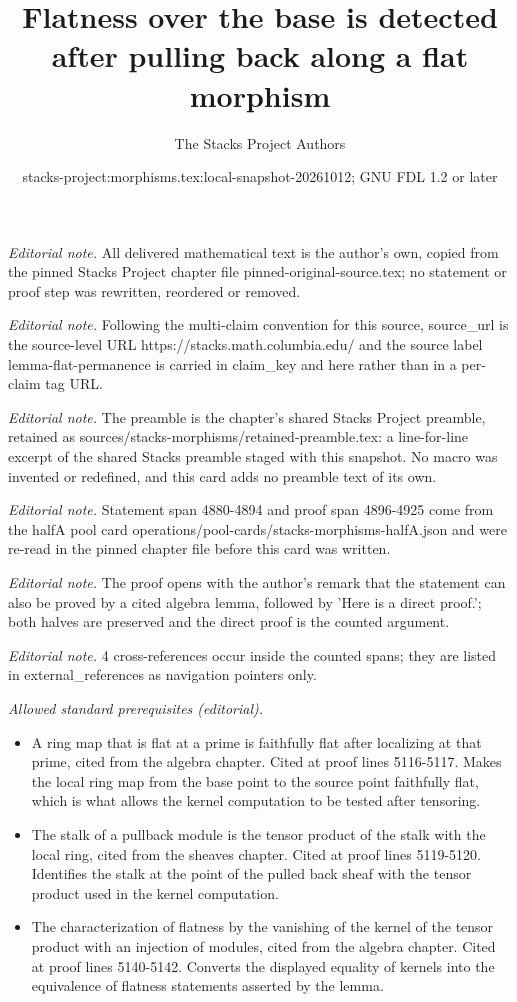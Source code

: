 \documentclass[10pt,a4paper]{amsart}
\title{Flatness over the base is detected after pulling back along a flat morphism}
\author{The Stacks Project Authors}
\date{stacks-project:morphisms.tex:local-snapshot-20261012; GNU FDL 1.2 or later}
\theoremstyle{plain}
\theoremstyle{definition}
\theoremstyle{remark}
\numberwithin{equation}{subsection}
\begin{document}
\maketitle
\noindent\textit{Editorial note.} All delivered mathematical text is the author's own, copied from the pinned Stacks Project chapter file pinned-original-source.tex; no statement or proof step was rewritten, reordered or removed.\par\medskip
\noindent\textit{Editorial note.} Following the multi-claim convention for this source, source\_url is the source-level URL https://stacks.math.columbia.edu/ and the source label lemma-flat-permanence is carried in claim\_key and here rather than in a per-claim tag URL.\par\medskip
\noindent\textit{Editorial note.} The preamble is the chapter's shared Stacks Project preamble, retained as sources/stacks-morphisms/retained-preamble.tex: a line-for-line excerpt of the shared Stacks preamble staged with this snapshot. No macro was invented or redefined, and this card adds no preamble text of its own.\par\medskip
\noindent\textit{Editorial note.} Statement span 4880-4894 and proof span 4896-4925 come from the halfA pool card operations/pool-cards/stacks-morphisms-halfA.json and were re-read in the pinned chapter file before this card was written.\par\medskip
\noindent\textit{Editorial note.} The proof opens with the author's remark that the statement can also be proved by a cited algebra lemma, followed by 'Here is a direct proof.'; both halves are preserved and the direct proof is the counted argument.\par\medskip
\noindent\textit{Editorial note.} 4 cross-references occur inside the counted spans; they are listed in external\_references as navigation pointers only.\par\medskip
\noindent\textit{Allowed standard prerequisites (editorial).}\begin{itemize}
\item A ring map that is flat at a prime is faithfully flat after localizing at that prime, cited from the algebra chapter. Cited at proof lines 5116-5117. Makes the local ring map from the base point to the source point faithfully flat, which is what allows the kernel computation to be tested after tensoring.
\item The stalk of a pullback module is the tensor product of the stalk with the local ring, cited from the sheaves chapter. Cited at proof lines 5119-5120. Identifies the stalk at the point of the pulled back sheaf with the tensor product used in the kernel computation.
\item The characterization of flatness by the vanishing of the kernel of the tensor product with an injection of modules, cited from the algebra chapter. Cited at proof lines 5140-5142. Converts the displayed equality of kernels into the equivalence of flatness statements asserted by the lemma.
\end{itemize}\medskip
\end{document}
